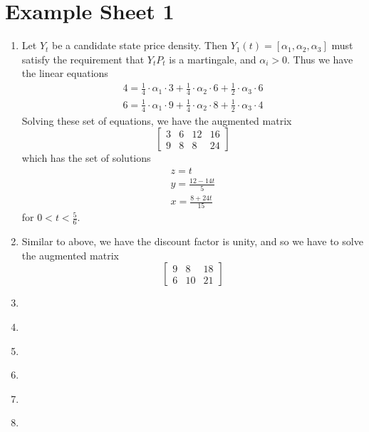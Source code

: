 \chapter{Example Sheet 1}
\label{cha:example-sheet-1}

\begin{enumerate}
\item \label{item:1} Let $Y_{t}$ be a candidate state price density. Then $Y_{1}(t) =
  [\alpha_{1}, \alpha_{2}, \alpha_{3}]$ must satisfy the requirement
  that $Y_{t} P_{t}$ is a martingale, and $\alpha_{i} > 0$. Thus we
  have the linear equations
  \begin{align}
    \label{eq:2}
    4 = \frac{1}{4} \cdot \alpha_{1} \cdot 3 + \frac{1}{4} \cdot
    \alpha_{2} \cdot 6 + \frac{1}{2} \cdot \alpha_{3} \cdot 6 \\
    6 = \frac{1}{4} \cdot \alpha_{1} \cdot 9 + \frac{1}{4} \cdot
    \alpha_{2} \cdot 8 + \frac{1}{2} \cdot \alpha_{3} \cdot 4
  \end{align}
  Solving these set of equations, we have the augmented matrix
  \begin{equation}
    \label{eq:4}
    \begin{bmatrix}
      3 & 6 & 12 & 16 \\
      9 & 8 & 8  & 24 
    \end{bmatrix}
  \end{equation}
  which has the set of solutions
  \begin{align}
    \label{eq:5}
    z = t \\
    y = \frac{12 - 14t}{5} \\
    x = \frac{8 + 24t}{15}
  \end{align} for $0 < t < \frac{5}{6}$.
\item \label{item:2} Similar to above, we have the discount factor is unity, and so
  we have to solve the augmented matrix
  \begin{equation}
    \label{eq:6}
    \begin{bmatrix}
      9 & 8 & 18 \\
      6 & 10 & 21
    \end{bmatrix}
  \end{equation}
\item \label{item:3}
\item \label{item:4}
\item \label{item:5}
\item \label{item:6}
\item \label{item:7}
\item \label{item:8}

\end{enumerate}
